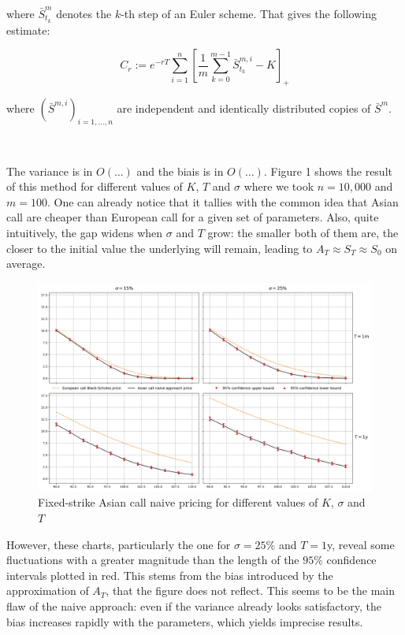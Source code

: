 \documentclass{article}
\begin{document}
where $\bar S_{t_k}^m$ denotes the $k$-th step of an Euler scheme. That gives the following estimate:

\begin{equation}
	C_r := e^{-rT} \sum_{i=1}^n \left[ \frac{1}{m} \sum_{k=0}^{m-1} \bar S_{t_k}^{m, i} - K \right]_+
	\tag{1}
\end{equation}

where $\left( \bar S^{m, i} \right)_{i = 1, \dots, n}$ are independent and identically distributed copies of $\bar S^m$.

\

The variance is in $O \left( \dots \right)$ and the biais is in $O \left( \dots \right)$. Figure 1 shows the result
of this method for different values of $K$, $T$ and $\sigma$ where we took $n =10,000$ and $m=100$.
One can already notice that it tallies with the common idea that Asian call are cheaper than European call
for a given set of parameters. Also, quite intuitively, the gap widens when $\sigma$ and $T$ grow: the smaller
both of them are, the closer to the initial value the underlying will remain, leading to $A_T \approx S_T \approx S_0$
on average.

\begin{figure}[H]
  \hspace*{-0.02\linewidth}\includegraphics[width=1.065\textwidth]{charts/prices.png}
  \caption{Fixed-strike Asian call naive pricing for different values of $K$, $\sigma$ and $T$}
\end{figure}

However, these charts, particularly the one for $\sigma = 25\%$ and $T=1$y, reveal some fluctuations with
a greater magnitude than the length of the $95\%$ confidence intervals plotted in red. This stems from the bias
introduced by the approximation of $A_T$, that the figure does not reflect. This seems to be the main flaw of the
naive approach: even if the variance already looks satisfactory, the bias increases rapidly with the parameters, which
yields imprecise results.
\end{document}
